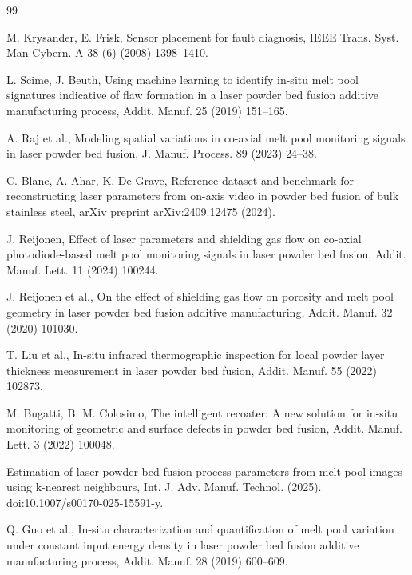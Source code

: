 \documentclass[preprint,times]{elsarticle}
\begin{document}
\begin{thebibliography}{99}
\scriptsize
\setlength{\itemsep}{-2pt}\setlength{\parskip}{0pt}

M. Krysander, E. Frisk, Sensor placement for fault diagnosis, IEEE Trans. Syst. Man Cybern. A 38 (6) (2008)
1398--1410.

L. Scime, J. Beuth, Using machine learning to identify in-situ melt pool
signatures indicative of flaw formation in a laser powder bed fusion additive
manufacturing process, Addit. Manuf. 25 (2019) 151--165.

A. Raj et al., Modeling spatial variations in co-axial melt pool monitoring signals in laser
powder bed fusion, J. Manuf. Process. 89 (2023) 24--38.

C. Blanc, A. Ahar, K. De Grave, Reference dataset and benchmark for
reconstructing laser parameters from on-axis video in powder bed fusion of bulk
stainless steel, arXiv preprint arXiv:2409.12475 (2024).

J. Reijonen, Effect of laser parameters and shielding gas flow on co-axial
photodiode-based melt pool monitoring signals in laser powder bed fusion,
Addit. Manuf. Lett. 11 (2024) 100244.

J. Reijonen et al., On the effect of shielding gas flow on porosity and melt
pool geometry in laser powder bed fusion additive manufacturing, Addit. Manuf.
32 (2020) 101030.

T. Liu et al., In-situ infrared thermographic inspection for local powder layer
thickness measurement in laser powder bed fusion, Addit. Manuf. 55
(2022) 102873.

M. Bugatti, B. M. Colosimo, The intelligent recoater: A new solution for in-situ
monitoring of geometric and surface defects in powder bed fusion, Addit. Manuf. Lett. 3 (2022) 100048.

Estimation of laser powder bed fusion process parameters from melt pool images
using k-nearest neighbours, Int. J. Adv. Manuf. Technol. (2025). doi:10.1007/s00170-025-15591-y.

Q. Guo et al., In-situ
characterization and quantification of melt pool variation under constant input
energy density in laser powder bed fusion additive manufacturing process,
Addit. Manuf. 28 (2019) 600--609.


\end{thebibliography}
\end{document}
